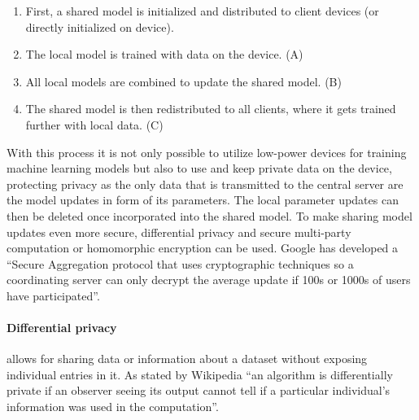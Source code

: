\begin{enumerate}
    \item First, a shared model is initialized and distributed to client devices (or directly initialized on device).
    \item The local model is trained with data on the device. (A)
    \item All local models are combined to update the shared model. (B) 
    \item The shared model is then redistributed to all clients, where it gets trained further with local data. (C)
\end{enumerate}

With this process it is not only possible to utilize low-power devices for training machine learning models but also to use and keep private data on the device, protecting privacy as the only data that is transmitted to the central server are the model updates in form of its parameters. The local parameter updates can then be deleted once incorporated into the shared model. To make sharing model updates even more secure, differential privacy and secure multi-party computation or homomorphic encryption can be used. Google has developed a \enquote{Secure Aggregation protocol that uses cryptographic techniques so a coordinating server can only decrypt the average update if 100s or 1000s of users have participated}\cite{google_ai_federated_learning}.

\paragraph{Differential privacy} allows for sharing data or information about a dataset without exposing individual entries in it. As stated by Wikipedia \enquote{an algorithm is differentially private if an observer seeing its output cannot tell if a particular individual's information was used in the computation}\cite{wiki_dp}.

